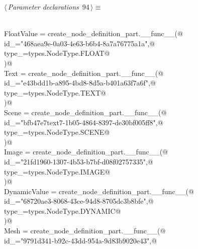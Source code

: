\documentclass[
    a4paper,      %
    10pt,         %
    openright,    %
    notitlepage,  %
    parskip=half, %
]{scrreprt}       %
\theoremstyle{definition}                    %
\begin{document}
\begin{flushleft} \small
\begin{minipage}{\linewidth}\label{scrap150}\raggedright\small
{} $\langle\,${\itshape Parameter declarations}\nobreak\ {\footnotesize {94}}$\,\rangle\equiv$
\vspace{-1exm}
\begin{list}{}{} \item
\mbox{}\lstinline@@\\
\mbox{}\lstinline@    FloatValue = create_node_definition_part.__func__(@\\
\mbox{}\lstinline@        id_="468aea9e-0a03-4e63-b6b4-8a7a76775a1a",@\\
\mbox{}\lstinline@        type_=types.NodeType.FLOAT@\\
\mbox{}\lstinline@    )@\\
\mbox{}\lstinline@    Text = create_node_definition_part.__func__(@\\
\mbox{}\lstinline@        id_="e43bdd1b-a895-4bd8-8d5a-b401a63f7a6f",@\\
\mbox{}\lstinline@        type_=types.NodeType.TEXT@\\
\mbox{}\lstinline@    )@\\
\mbox{}\lstinline@    Scene = create_node_definition_part.__func__(@\\
\mbox{}\lstinline@        id_="bfb47e7text7-1b05-4864-8397-de30bf005ff8",@\\
\mbox{}\lstinline@        type_=types.NodeType.SCENE@\\
\mbox{}\lstinline@    )@\\
\mbox{}\lstinline@    Image = create_node_definition_part.__func__(@\\
\mbox{}\lstinline@        id_="21fd1960-1307-4b53-b7bf-d08f02757335",@\\
\mbox{}\lstinline@        type_=types.NodeType.IMAGE@\\
\mbox{}\lstinline@    )@\\
\mbox{}\lstinline@    DynamicValue = create_node_definition_part.__func__(@\\
\mbox{}\lstinline@        id_="68720ae3-8068-43ce-94d8-8705dc3b8bfe",@\\
\mbox{}\lstinline@        type_=types.NodeType.DYNAMIC@\\
\mbox{}\lstinline@    )@\\
\mbox{}\lstinline@    Mesh = create_node_definition_part.__func__(@\\
\mbox{}\lstinline@        id_="9791d341-b92c-43dd-954a-9d83b9020e43",@\\

\end{list}
\end{minipage}
\end{flushleft}
\end{document}
